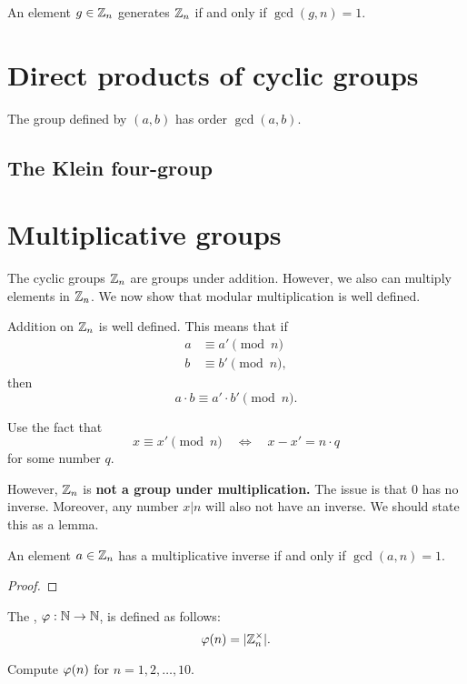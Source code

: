 \documentclass{ximera}
\begin{document}
\begin{theorem}
  An element $g\in \mathbb Z_n$ generates $\mathbb Z_n$ if and only if $\gcd(g,n) =
  1$.
\end{theorem}










\section{Direct products of cyclic groups}

The group defined by $(a,b)$ has order $\gcd(a,b)$.

\subsection{The Klein four-group}












\section{Multiplicative groups}


The cyclic groups $\mathbb Z_n$ are groups under addition. However, we also
can multiply elements in $\mathbb Z_n$. We now show that modular
multiplication is well defined.

\begin{lemma}
  Addition on $\mathbb Z_n$ is well defined. This means that if
  \begin{align*}
    a &\equiv a' \pmod{n}\\
    b &\equiv b' \pmod{n},
  \end{align*}
  then
  \[
  a\cdot b \equiv a'\cdot b' \pmod{n}.
  \]
  \begin{sketch}
    Use the fact that
    \[
    x \equiv x'\pmod{n} \quad \Leftrightarrow \quad x -x' = n\cdot q
    \]
    for some number $q$.
  \end{sketch}
\end{lemma}

However, $\mathbb Z_n$ is \textbf{not a group under multiplication.} The
issue is that $0$ has no inverse. Moreover, any number $x|n$ will also
not have an inverse. We should state this as a lemma.

\begin{lemma}
  An element $a\in\mathbb Z_n$ has a multiplicative inverse if and only if
  $\gcd(a,n) = 1$.
  \begin{proof}
  \end{proof}
\end{lemma}

\begin{definition}
  The , $\eulerphi:\N\to\N$, is defined as
  follows:
  \[
  \eulerphi(n) = |\Z_n^\times|.
  \]
\end{definition}

\begin{exercise}
  Compute $\eulerphi(n)$ for $n = 1,2,\dots, 10$.
\end{exercise}
\end{document}
